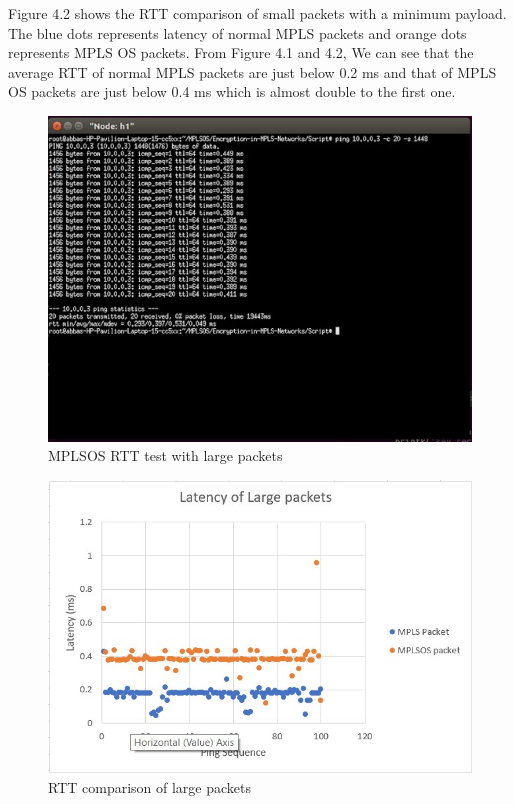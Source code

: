 Figure 4.2 shows the RTT comparison of small packets with a minimum payload. The blue dots represents latency of normal MPLS packets and orange dots represents MPLS OS packets.
From Figure 4.1 and 4.2, We can see that the average RTT of normal MPLS packets are just below 0.2 ms and that of MPLS OS packets are just below 0.4 ms which is almost double to the first one.\\


\begin{figure}
       \centering\includegraphics[width=\textwidth]{Final/MPLSOS_Large.jpg}
       \caption{MPLSOS RTT test with large packets}
       \label{fig:compbest}
\end{figure}

\begin{figure}
       \centering\includegraphics[width=\textwidth]{Final/Latency_large.jpg}
       \caption{RTT comparison of large packets}
       \label{fig:compbest}
\end{figure}


